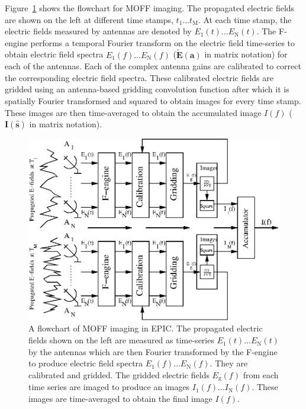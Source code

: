 \documentclass[a4paper,fleqn,usenatbib]{../mnras}
\begin{document}
Figure~\ref{fig:MOFF-flowchart} shows the flowchart for MOFF imaging. The
propagated electric fields are shown on the left at different time stamps,
$t_1\ldots t_\textrm{M}$. At each time stamp, the electric fields measured by
antennas are denoted by $E_1(t)\ldots E_\textrm{N}(t)$. The F-engine performs a
temporal Fourier transform on the electric field time-series to obtain electric
field spectra $E_1(f)\ldots E_\textrm{N}(f)$ ($\widetilde{\mathbf{E}}(\mathbf{a})$ in matrix
notation) for each of the antennas. Each of the complex antenna gains are
calibrated to correct the corresponding electric field spectra. These calibrated
electric fields are gridded using an antenna-based gridding convolution function
after which it is spatially Fourier transformed and squared to obtain images
for every time stamp. These images are then time-averaged to obtain the
accumulated image $I(f)$ ($\mathbf{I}(\hat{\mathbf{s}})$ in matrix notation).
\begin{figure}
  \includegraphics[width=\columnwidth]{MOFF_flowchart.eps}
  \caption{A flowchart of MOFF imaging in EPIC. The propagated electric fields
    shown on the left are measured as time-series $E_1(t)\ldots E_\textrm{N}(t)$
    by the antennas which are then Fourier transformed by the F-engine to produce
    electric field spectra $E_1(f)\ldots E_\textrm{N}(f)$. They are calibrated and
    gridded. The gridded electric fields $E_\textrm{g}(f)$ from each time series
    are imaged to produce an images $I_1(f)\ldots I_\textrm{N}(f)$. These images
    are time-averaged to obtain the final image $I(f)$.}
  \label{fig:MOFF-flowchart}
\end{figure}
\end{document}
